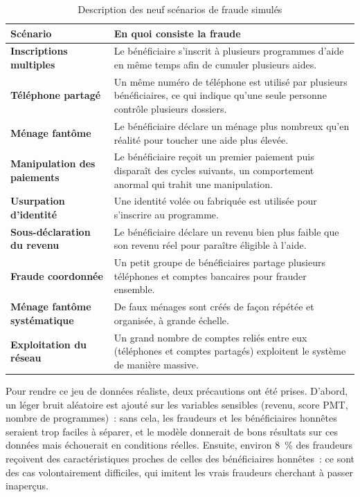 \documentclass[a4paper, oneside, 12pt]{book}
\newcommand{\thead}[1]{\cellcolor{EYdark}\textcolor{white}{\textbf{#1}}}
\renewcommand{\thead}[1]{\cellcolor{EYyellow}\textcolor{EYdark}{\textbf{#1}}}
\begin{document}
\begin{table}[H]
\centering
\caption{Description des neuf scénarios de fraude simulés}
\label{tab:scenarios-fraude}
\renewcommand{\arraystretch}{1.4}
\begin{tabular}{>{\bfseries}p{4cm} p{10.8cm}}
\hline
\thead{Scénario} & \thead{En quoi consiste la fraude} \\
\hline
\rowcolor{EYgray}
Inscriptions multiples & Le bénéficiaire s'inscrit à plusieurs programmes d'aide en même temps afin de cumuler plusieurs aides. \\
Téléphone partagé & Un même numéro de téléphone est utilisé par plusieurs bénéficiaires, ce qui indique qu'une seule personne contrôle plusieurs dossiers. \\
\rowcolor{EYgray}
Ménage fantôme & Le bénéficiaire déclare un ménage plus nombreux qu'en réalité pour toucher une aide plus élevée. \\
Manipulation des paiements & Le bénéficiaire reçoit un premier paiement puis disparaît des cycles suivants, un comportement anormal qui trahit une manipulation. \\
\rowcolor{EYgray}
Usurpation d'identité & Une identité volée ou fabriquée est utilisée pour s'inscrire au programme. \\
Sous-déclaration du revenu & Le bénéficiaire déclare un revenu bien plus faible que son revenu réel pour paraître éligible à l'aide. \\
\rowcolor{EYgray}
Fraude coordonnée & Un petit groupe de bénéficiaires partage plusieurs téléphones et comptes bancaires pour frauder ensemble. \\
Ménage fantôme systématique & De faux ménages sont créés de façon répétée et organisée, à grande échelle. \\
\rowcolor{EYgray}
Exploitation du réseau & Un grand nombre de comptes reliés entre eux (téléphones et comptes partagés) exploitent le système de manière massive. \\
\hline
\end{tabular}
\end{table}

\hspace{0.5cm}Pour rendre ce jeu de données réaliste, deux précautions ont été prises. D'abord, un léger bruit aléatoire est ajouté sur les variables sensibles (revenu, score PMT, nombre de programmes)~: sans cela, les fraudeurs et les bénéficiaires honnêtes seraient trop faciles à séparer, et le modèle donnerait de bons résultats sur ces données mais échouerait en conditions réelles. Ensuite, environ 8~\% des fraudeurs reçoivent des caractéristiques proches de celles des bénéficiaires honnêtes~: ce sont des cas volontairement difficiles, qui imitent les vrais fraudeurs cherchant à passer inaperçus.
\end{document}
